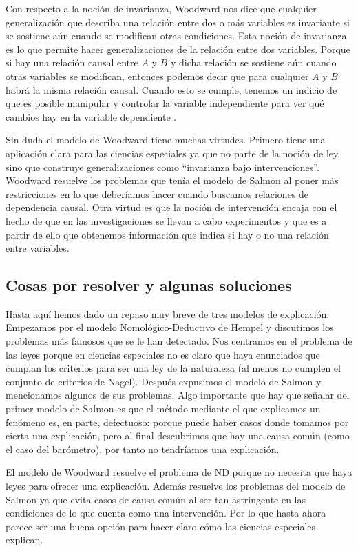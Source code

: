 {Con respecto a la noción de invarianza, Woodward nos dice que cualquier generalización que describa una relación entre dos o más variables es invariante si se sostiene aún cuando se modifican otras condiciones. Esta noción de invarianza es lo que permite hacer generalizaciones de la relación entre dos variables. Porque si hay una relación causal entre $A$ y $B$ y dicha relación se sostiene aún cuando otras variables se modifican, entonces podemos decir que para cualquier $A$ y $B$ habrá la misma relación causal. Cuando esto se cumple, tenemos un indicio de que es posible manipular y controlar la variable independiente para ver qué cambios hay en la variable dependiente \cite{Woodward2000}.

Sin duda el modelo de Woodward tiene muchas virtudes. Primero tiene una aplicación clara para las ciencias especiales ya que no parte de la noción de ley, sino que construye generalizaciones como ``invarianza bajo intervenciones''. Woodward resuelve los problemas que tenía el modelo de Salmon al poner más restricciones en lo que deberíamos hacer cuando buscamos relaciones de dependencia causal. Otra virtud es que la noción de intervención encaja con el hecho de que en las investigaciones se llevan a cabo experimentos y que es a partir de ello que obtenemos información que indica si hay o no una relación entre variables.

\subsection{Cosas por resolver y algunas soluciones}

\noindent Hasta aquí hemos dado un repaso muy breve de tres modelos de explicación. Empezamos por el modelo Nomológico-Deductivo de Hempel y discutimos los problemas más famosos que se le han detectado. Nos centramos en el problema de las leyes porque en ciencias especiales no es claro que haya enunciados que cumplan los criterios para ser una ley de la naturaleza (al menos no cumplen el conjunto de criterios de Nagel). Después expusimos el modelo de Salmon y mencionamos algunos de sus problemas. Algo importante que hay que señalar del primer modelo de Salmon es que el método mediante el que explicamos un fenómeno es, en parte, defectuoso: porque puede haber casos donde tomamos por cierta una explicación, pero al final descubrimos que hay una causa común (como el caso del barómetro), por tanto no tendríamos una explicación.

El modelo de Woodward resuelve el problema de ND porque no necesita que haya leyes para ofrecer una explicación. Además resuelve los problemas del modelo de Salmon ya que evita casos de causa común al ser tan astringente en las condiciones de lo que cuenta como una intervención. Por lo que hasta ahora parece ser una buena opción para hacer claro cómo las ciencias especiales explican.

}
